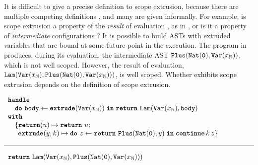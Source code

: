 It is difficult to give a precise definition to scope extrusion, because there are multiple competing definitions \citep{kiselyov-14,kiselyov-16}, and many are given informally. For example, is scope extrusion a property of the \textit{result} of evaluation \citep{kiselyov-16}, as in , or is it a property of \textit{intermediate} configurations \citep{kiselyov-14}? It is possible to build ASTs with extruded variables that are bound at some future point in the execution. The program in  produces, during its evaluation, the intermediate AST $\texttt{Plus}(\texttt{Nat}(\texttt{0}), \texttt{Var}(x_{\mathbb{N}}))$, which is not well scoped. However, the result of evaluation, $\texttt{Lam}(\texttt{Var}(x_{\mathbb{N}}), \texttt{Plus}(\texttt{Nat}(\texttt{0}), \texttt{Var}(x_{\mathbb{N}})))$, is well scoped. Whether  exhibits scope extrusion depends on the definition of scope extrusion.

\begin{code}
  \begin{efflst}
    $\begin{array}{l}
      \textbf{\texttt{handle}} \\
      \quad \texttt{\textbf{do}} \,\, {\texttt{body}} \leftarrow {\textbf{\texttt{extrude}}({\texttt{Var}(x_{\mathbb{N}})})} \; \textbf{\texttt{in}} \; {\texttt{\textbf{return}} \,\, {\texttt{Lam}(\texttt{Var}(x_{\mathbb{N}}), \texttt{body})}} \\
      \textbf{\texttt{with}} \\
      \quad \{ \textbf{\texttt{return}}(u) \mapsto \texttt{\textbf{return}} \,\, {u}; \\
      \quad \; \, \textbf{\texttt{extrude}}(y, k) \mapsto { \texttt{\textbf{do}} \,\, {z} \leftarrow {\texttt{\textbf{return}} \,\, {\texttt{Plus}({\texttt{Nat}(\texttt{0})}, y)}} \; \textbf{\texttt{in}} \; {\textbf{\texttt{continue}} \, {k} \, {z}}} \}\\
    \end{array}$

    \vspace{2mm} 
\textcolor{effComment}{\hrule height 0.2mm \relax}
\vspace{2mm} 

\textcolor{effComment}{$\begin{array}{l}\texttt{\textbf{return}} \,\, {\texttt{Lam}(\texttt{Var}(x_{\mathbb{N}}), \texttt{Plus}(\texttt{Nat}(\texttt{0}), \texttt{Var}(x_{\mathbb{N}})))}\end{array}$}

\end{efflst}
%
\label{listing:efflang-maybe-scope-extrusion}
\end{code}


